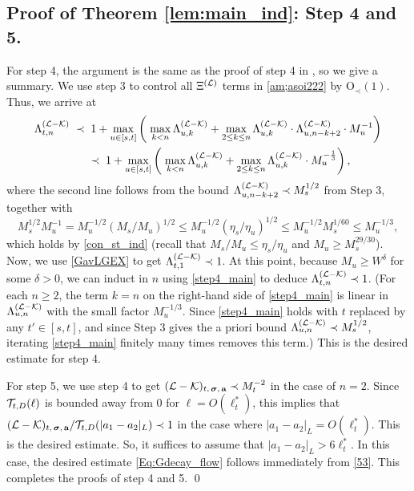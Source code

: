  

 
\subsection{Proof of  Theorem \ref{lem:main_ind}: Step 4 and 5.}

For step 4, the argument is the same as the proof of step 4 in \cite{YY_25}, so we give a summary. We use step $3$ to control all $\Xi^{({\cal L})}$ terms in \eqref{am;asoi222} by $\mathrm{O}_{\prec}(1)$. Thus, we arrive at
%
\begin{align}
 \Lambda^{({\cal L-\cal K})}_{t,n}
 \;\prec\;  &\;  1+ \max_{u\in [s,t]}
  \left(\; \max_{k<n }\Lambda^{({\cal L-\cal K})}_{u,k}+\max_{2\le k\le n }\Lambda^{({\cal L-\cal K})}_{u,k}\cdot \Lambda^{({\cal L-\cal K})}_{u,n-k+2}\cdot M_{u}^{-1}\right)\nonumber\\
  &\prec\; 1+ \max_{u\in [s,t]}
  \left(\; \max_{k<n }\Lambda^{({\cal L-\cal K})}_{u,k}+\max_{2\le k\le n }\Lambda^{({\cal L-\cal K})}_{u,k}\cdot M_{u}^{-\frac13}\right),\label{step4_main}
\end{align}
%
where the second line follows from the bound $\Lambda^{({\cal L}-{\cal K})}_{u,n-k+2}\prec M_{s}^{1/2}$ from Step 3, together with
$$M_{s}^{1/2}M_{u}^{-1}=M_{u}^{-1/2}(M_{s}/M_{u})^{1/2}\leq M_{u}^{-1/2}(\eta_{s}/\eta_{u})^{1/2}\leq M_{u}^{-1/2}M_{s}^{1/60}\leq M_{u}^{-1/3},$$
which holds by \eqref{con_st_ind} (recall that $M_{s}/M_{u}\leq\eta_{s}/\eta_{u}$ and $M_{u}\geq M_{s}^{29/30}$). Now, we use \eqref{GavLGEX} to get $\Lambda^{({\cal L}-{\cal K})}_{t,1}\prec1$. At this point, because $M_{u}\geq W^{\delta}$ for some $\delta>0$, we can induct in $n$ using \eqref{step4_main} to deduce $\Lambda^{({\cal L}-{\cal K})}_{t,n}\prec1$. (For each $n\geq2$, the term $k=n$ on the right-hand side of \eqref{step4_main} is linear in $\Lambda^{({\cal L}-{\cal K})}_{u,n}$ with the small factor $M_{u}^{-1/3}$. Since \eqref{step4_main} holds with $t$ replaced by any $t'\in[s,t]$, and since Step 3 gives the a priori bound $\Lambda^{({\cal L}-{\cal K})}_{u,n}\prec M_{s}^{1/2}$, iterating \eqref{step4_main} finitely many times removes this term.) This is the desired estimate for step 4.

For step 5, we use step 4 to get $({\cal L}-{\cal K})_{t,\, \boldsymbol{\sigma},  \,\textbf{a}}\prec M_{t}^{-2} $ in the case of $n=2$. Since ${\cal T}_{t,D}(\ell)$ is bounded away from $0$ for $\ell=O(\ell_{t}^{*})$, this implies that $({\cal L}-{\cal K})_{t,\, \boldsymbol{\sigma},  \,\textbf{a}}/{\cal T}_{t, D}(|a_1-a_2|_{L}) \prec1$ in the case where $|a_{1}-a_{2}|_{L}=O(\ell_{t}^{*})$. This is the desired estimate. So, it suffices to assume that $|a_{1}-a_{2}|_{L}>6\ell_{t}^{*}$. In this case, the desired estimate \eqref{Eq:Gdecay_flow} follows immediately from \eqref{53}. This completes the proofs of step 4 and 5. \qed











